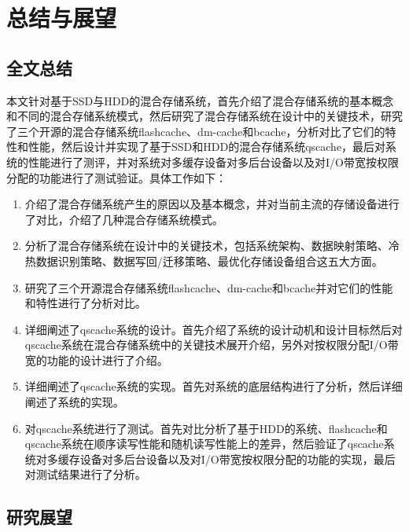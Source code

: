 

\chapter{总结与展望}
\label{chap:summary}

\section{全文总结}

本文针对基于SSD与HDD的混合存储系统，首先介绍了混合存储系统的基本概念和不同的混合存储系统模式，然后研究了混合存储系统在设计中的关键技术，研究了三个开源的混合存储系统flashcache、dm-cache和bcache，分析对比了它们的特性和性能，然后设计并实现了基于SSD和HDD的混合存储系统qscache，最后对系统的性能进行了测评，并对系统对多缓存设备对多后台设备以及对I/O带宽按权限分配的功能进行了测试验证。具体工作如下：

\begin{enumerate}[leftmargin=0pt, itemindent=39pt]
    \item 介绍了混合存储系统产生的原因以及基本概念，并对当前主流的存储设备进行了对比，介绍了几种混合存储系统模式。
    \item 分析了混合存储系统在设计中的关键技术，包括系统架构、数据映射策略、冷热数据识别策略、数据写回/迁移策略、最优化存储设备组合这五大方面。
    \item 研究了三个开源混合存储系统flashcache、dm-cache和bcache并对它们的性能和特性进行了分析对比。
    \item 详细阐述了qscache系统的设计。首先介绍了系统的设计动机和设计目标然后对qscache系统在混合存储系统中的关键技术展开介绍，另外对按权限分配I/O带宽的功能的设计进行了介绍。
    \item 详细阐述了qscache系统的实现。首先对系统的底层结构进行了分析，然后详细阐述了系统的实现。
    \item 对qscache系统进行了测试。首先对比分析了基于HDD的系统、flashcache和qscache系统在顺序读写性能和随机读写性能上的差异，然后验证了qscache系统对多缓存设备对多后台设备以及对I/O带宽按权限分配的功能的实现，最后对测试结果进行了分析。
\end{enumerate}

\section{研究展望}

